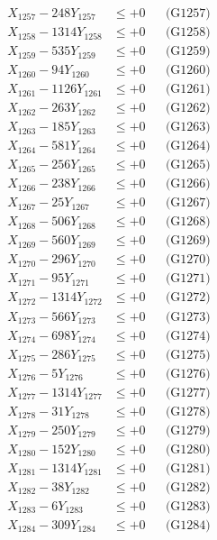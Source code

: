 \documentclass[a4paper,10pt]{article}
\begin{document}
{\begin{align}
X_{1257} - 248Y_{1257} &\leq +0 && \text{(G1257)} \\
X_{1258} - 1314Y_{1258} &\leq +0 && \text{(G1258)} \\
X_{1259} - 535Y_{1259} &\leq +0 && \text{(G1259)} \\
X_{1260} - 94Y_{1260} &\leq +0 && \text{(G1260)} \\
\allowbreak
X_{1261} - 1126Y_{1261} &\leq +0 && \text{(G1261)} \\
X_{1262} - 263Y_{1262} &\leq +0 && \text{(G1262)} \\
X_{1263} - 185Y_{1263} &\leq +0 && \text{(G1263)} \\
X_{1264} - 581Y_{1264} &\leq +0 && \text{(G1264)} \\
X_{1265} - 256Y_{1265} &\leq +0 && \text{(G1265)} \\
X_{1266} - 238Y_{1266} &\leq +0 && \text{(G1266)} \\
X_{1267} - 25Y_{1267} &\leq +0 && \text{(G1267)} \\
X_{1268} - 506Y_{1268} &\leq +0 && \text{(G1268)} \\
X_{1269} - 560Y_{1269} &\leq +0 && \text{(G1269)} \\
X_{1270} - 296Y_{1270} &\leq +0 && \text{(G1270)} \\
\allowbreak
X_{1271} - 95Y_{1271} &\leq +0 && \text{(G1271)} \\
X_{1272} - 1314Y_{1272} &\leq +0 && \text{(G1272)} \\
X_{1273} - 566Y_{1273} &\leq +0 && \text{(G1273)} \\
X_{1274} - 698Y_{1274} &\leq +0 && \text{(G1274)} \\
X_{1275} - 286Y_{1275} &\leq +0 && \text{(G1275)} \\
X_{1276} - 5Y_{1276} &\leq +0 && \text{(G1276)} \\
X_{1277} - 1314Y_{1277} &\leq +0 && \text{(G1277)} \\
X_{1278} - 31Y_{1278} &\leq +0 && \text{(G1278)} \\
X_{1279} - 250Y_{1279} &\leq +0 && \text{(G1279)} \\
X_{1280} - 152Y_{1280} &\leq +0 && \text{(G1280)} \\
\allowbreak
X_{1281} - 1314Y_{1281} &\leq +0 && \text{(G1281)} \\
X_{1282} - 38Y_{1282} &\leq +0 && \text{(G1282)} \\
X_{1283} - 6Y_{1283} &\leq +0 && \text{(G1283)} \\
X_{1284} - 309Y_{1284} &\leq +0 && \text{(G1284)} \\

\end{align}}
\end{document}
